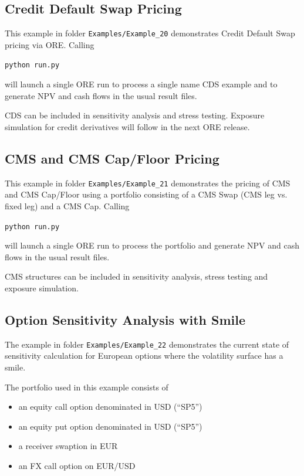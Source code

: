 \documentclass[12pt, a4paper]{article}
\begin{document}
\subsection{Credit Default Swap Pricing}%

This example in folder {\tt Examples/Example\_20} demonstrates Credit Default Swap pricing via ORE. Calling

\medskip
\centerline{\tt python run.py}

\medskip
will launch a single ORE run to process a single name CDS example and to generate NPV and cash flows in the usual result files. 

\medskip
CDS can be included in sensitivity analysis and stress testing. Exposure simulation for credit derivatives will follow in the next ORE release.

\subsection{CMS and CMS Cap/Floor Pricing}%

This example in folder {\tt Examples/Example\_21} demonstrates the pricing of CMS and CMS Cap/Floor using a portfolio consisting of a CMS Swap (CMS leg vs. fixed leg) and a CMS Cap. Calling

\medskip
\centerline{\tt python run.py}

\medskip
will launch a single ORE run to process the portfolio and generate NPV and cash flows in the usual result files. 

\medskip
CMS structures can be included in sensitivity analysis, stress testing and exposure simulation. 

\subsection{Option Sensitivity Analysis with Smile}%

The example in folder {\tt Examples/Example\_22} demonstrates the current state of sensitivity calculation for European options where the volatility surface has a smile. 

\medskip
The portfolio used in this example consists of
\begin{itemize}
	\item an equity call option denominated in USD (``SP5'')
	\item an equity put option denominated in USD (``SP5'')
	\item a receiver swaption in EUR
	\item an FX call option on EUR/USD
\end{itemize}
\end{document}
